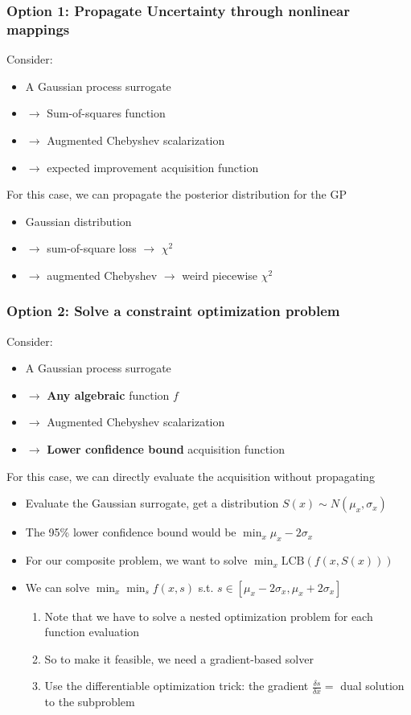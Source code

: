 \documentclass[aspectratio=169]{beamer}
\begin{document}
\begin{frame}\frametitle{Option 1: Propagate Uncertainty through nonlinear mappings}

Consider:
\begin{itemize}
  \item A Gaussian process surrogate 
  \item $\rightarrow$ Sum-of-squares function
  \item $\rightarrow$ Augmented Chebyshev scalarization 
  \item $\rightarrow$ expected improvement acquisition function
\end{itemize}

\bigskip

For this case, we can propagate the posterior distribution for the GP
\begin{itemize}
  \item Gaussian distribution
  \item $\rightarrow$ sum-of-square loss $\rightarrow$ $\chi^2$
  \item $\rightarrow$ augmented Chebyshev $\rightarrow$ weird piecewise $\chi^2$
\end{itemize}
\end{frame}

\begin{frame}\frametitle{Option 2: Solve a constraint optimization problem}

Consider:
\begin{itemize}
  \item A Gaussian process surrogate 
  \item $\rightarrow$ {\bf Any algebraic} function $f$
  \item $\rightarrow$ Augmented Chebyshev scalarization 
  \item $\rightarrow$ {\bf Lower confidence bound} acquisition function
\end{itemize}

\bigskip

For this case, we can directly evaluate the acquisition without propagating
\begin{itemize}
  \item Evaluate the Gaussian surrogate, get a distribution
  $S(x) \sim N(\mu_x, \sigma_x)$
  \item The 95\% lower confidence bound would be $\min_x \mu_x - 2\sigma_x$
  \item For our composite problem, we want to solve $\min_x \text{LCB}(f(x, S(x)))$
  \item We can solve $\min_x \min_s f(x, s)$ s.t. $s \in [\mu_x - 2\sigma_x, \mu_x + 2\sigma_x]$
  \begin{enumerate}
    \item Note that we have to solve a nested optimization problem for each
    function evaluation
    \item So to make it feasible, we need a gradient-based solver
    \item Use the differentiable optimization trick: the gradient
    $\frac{\delta s}{\delta x} = $ dual solution to the subproblem
  \end{enumerate}
\end{itemize}
\end{frame}
\end{document}

